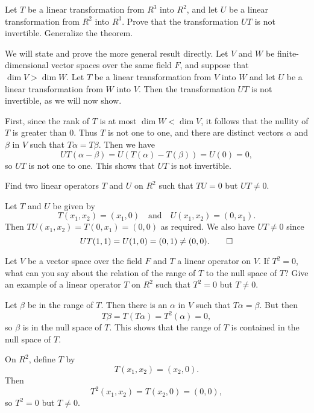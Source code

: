  Let $T$ be a linear transformation from $R^3$ into $R^2$,
and let $U$ be a linear transformation from $R^2$ into $R^3$. Prove
that the transformation $UT$ is not invertible. Generalize the
theorem.
\begin{solution}
  We will state and prove the more general result directly. Let $V$
  and $W$ be finite-dimensional vector spaces over the same field $F$,
  and suppose that $\dim V > \dim W$. Let $T$ be a linear
  transformation from $V$ into $W$ and let $U$ be a linear
  transformation from $W$ into $V$. Then the transformation $UT$ is
  not invertible, as we will now show.

  First, since the rank of $T$ is at most $\dim W < \dim V$, it
  follows that the nullity of $T$ is greater than $0$. Thus $T$ is not
  one to one, and there are distinct vectors $\alpha$ and $\beta$ in
  $V$ such that $T\alpha = T\beta$. Then we have
  \begin{equation*}
    UT(\alpha - \beta) = U(T(\alpha) - T(\beta)) = U(0) = 0,
  \end{equation*}
  so $UT$ is not one to one. This shows that $UT$ is not invertible.
\end{solution}

 Find two linear operators $T$ and $U$ on $R^2$ such that
$TU = 0$ but $UT \neq 0$.
\begin{solution}
  Let $T$ and $U$ be given by
  \begin{equation*}
    T(x_1,x_2) = (x_1,0) \quad\text{and}\quad
    U(x_1,x_2) = (0,x_1).
  \end{equation*}
  Then $TU(x_1,x_2) = T(0,x_1) = (0, 0)$ as required. We also have
  $UT\neq0$ since
  \begin{equation*}
    UT(1,1) = U(1,0) = (0,1) \neq (0,0). \qedhere
  \end{equation*}
\end{solution}

 Let $V$ be a vector space over the field $F$ and $T$ a
linear operator on $V$. If $T^2 = 0$, what can you say about the
relation of the range of $T$ to the null space of $T$? Give an example
of a linear operator $T$ on $R^2$ such that $T^2 = 0$ but $T\neq0$.
\begin{solution}
  Let $\beta$ be in the range of $T$. Then there is an $\alpha$ in $V$
  such that $T\alpha = \beta$. But then
  \begin{equation*}
    T\beta = T(T\alpha) = T^2(\alpha) = 0,
  \end{equation*}
  so $\beta$ is in the null space of $T$. This shows that the range of
  $T$ is contained in the null space of $T$.

  On $R^2$, define $T$ by
  \begin{equation*}
    T(x_1,x_2) = (x_2,0).
  \end{equation*}
  Then
  \begin{equation*}
    T^2(x_1,x_2) = T(x_2,0) = (0, 0),
  \end{equation*}
  so $T^2 = 0$ but $T\neq0$.
\end{solution}
